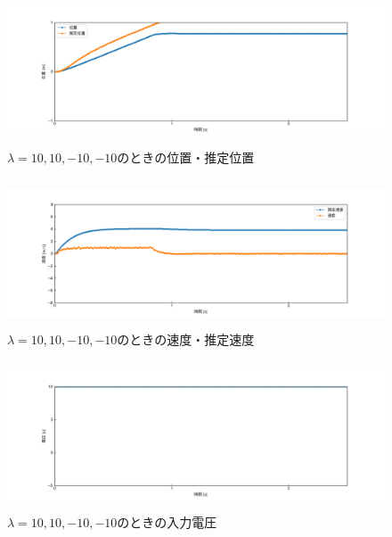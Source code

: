 \documentclass[12pt]{jsarticle}
\begin{document}
\begin{figure}[H]
  \begin{center}
    \includegraphics[clip,width=13.0cm, height=4.4cm]{../img/Exp5-1.png}
    \caption{$\lambda=10, 10, -10, -10$のときの位置・推定位置}
    \label{Exp5-1}
  \end{center}
\end{figure}
\begin{figure}[H]
  \begin{center}
    \includegraphics[clip,width=13.0cm, height=4.4cm]{../img/Exp5-2.png}
    \caption{$\lambda=10, 10, -10, -10$のときの速度・推定速度}
    \label{Exp5-2}
  \end{center}
\end{figure}
\begin{figure}[H]
  \begin{center}
    \includegraphics[clip,width=13.0cm, height=4.4cm]{../img/Exp5-3.png}
    \caption{$\lambda=10, 10, -10, -10$のときの入力電圧}
    \label{Exp5-3}
  \end{center}
\end{figure}
\end{document}
